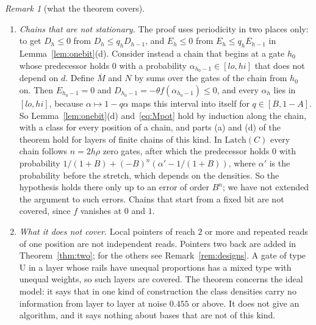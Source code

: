 \documentclass[11pt]{amsart}
\theoremstyle{definition}
\theoremstyle{remark}
\newtheorem{remark}[theorem]{Remark}
\begin{document}
\begin{remark}[what the theorem covers]
\begin{enumerate}[label=(\roman*),leftmargin=2.4em]
chosen, and the best exponents gain very little (about $0.4537$). A value iteration for the best potential that depends on $\alpha$ alone (script
\texttt{potential\_bellman.py}, not rigorous) gives a growth rate that crosses $1$ at about
$0.449$. So for single changes the level of this family appears to be about $0.449$, and a better
potential of the same kind could probably move the theorem close to it. For more than one
attracting set the supremum of the noise levels lies between about $0.447$ (numerically, one
design) and $0.455$.
\item \emph{Chains that are not stationary.} The proof uses periodicity in two places only: to
get $D_h\le0$ from $D_h\le q_hD_{h-1}$, and $E_h\le0$ from $E_h\le q_hE_{h-1}$ in
Lemma~\ref{lem:onebit}(d). Consider instead a chain that begins at a gate $h_0$ whose predecessor
holds $0$ with a probability $\alpha_{h_0-1}\in[lo,hi]$ that does not depend on $d$. Define
$\overline M$ and $N$ by sums over the gates of the chain from $h_0$ on. Then
$E_{h_0-1}=0$ and $D_{h_0-1}=-\theta f(\alpha_{h_0-1})\le0$, and every $\alpha_h$ lies in
$[lo,hi]$, because $\alpha\mapsto1-q\alpha$ maps this interval into itself for $q\in[B,1-A]$. So
Lemma~\ref{lem:onebit}(d) and~\eqref{eq:Mpot} hold by induction along the chain, with a class for
every position of a chain, and parts (a) and (d) of the theorem hold for layers of finite chains
of this kind. In $\mathrm{Latch}(C)$ every chain follows $n=2h\rho$ zero gates, after which the
predecessor holds $0$ with probability $1/(1+B)+(-B)^n(\alpha'-1/(1+B))$, where $\alpha'$ is the
probability before the stretch, which depends on the densities. So the hypothesis holds there only
up to an error of order $B^n$; we have not extended the argument to such errors. Chains that start
from a fixed bit are not covered, since $f$ vanishes at $0$ and $1$.
\item \emph{What it does not cover.} Local pointers of reach $2$ or more and repeated reads of one
position are not independent reads. Pointers two back are added in Theorem~\ref{thm:two}; for
the others see Remark~\ref{rem:designs}. A gate of type
$\mathrm U$ in a layer whose rails have unequal proportions has a mixed type with unequal
weights, so such layers are covered. The theorem concerns
the ideal model: it says that in one kind of construction the class densities carry no
information from layer to layer at noise $0.455$ or above. It does not give an algorithm, and it says nothing about bases that are
not of this kind.
\end{enumerate}
\end{remark}
\end{document}
